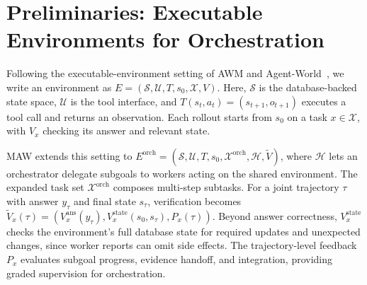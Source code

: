 \section{Preliminaries: Executable Environments for Orchestration}
\label{sec:preliminary}

Following the executable-environment setting of AWM and Agent-World~\citep{wang2026agentworldmodelinfinity,dong2026agentworld}, we write an environment as $E=(\mathcal S,\mathcal U,T,s_0,\mathcal X,V)$. Here, $\mathcal S$ is the database-backed state space, $\mathcal U$ is the tool interface, and $T(s_t,a_t)=(s_{t+1},o_{t+1})$ executes a tool call and returns an observation. Each rollout starts from $s_0$ on a task $x\in\mathcal X$, with $V_x$ checking its answer and relevant state.

MAW extends this setting to $E^{\mathrm{orch}}=(\mathcal S,\mathcal U,T,s_0,\mathcal X^{\mathrm{orch}},\mathcal H,\widetilde V)$, where $\mathcal H$ lets an orchestrator delegate subgoals to workers acting on the shared environment. The expanded task set $\mathcal X^{\mathrm{orch}}$ composes multi-step subtasks. For a joint trajectory $\tau$ with answer $y_\tau$ and final state $s_\tau$, verification becomes $\widetilde V_x(\tau)=(V_x^{\mathrm{ans}}(y_\tau),V_x^{\mathrm{state}}(s_0,s_\tau),P_x(\tau))$. Beyond answer correctness, $V_x^{\mathrm{state}}$ checks the environment's full database state for required updates and unexpected changes, since worker reports can omit side effects. The trajectory-level feedback $P_x$ evaluates subgoal progress, evidence handoff, and integration, providing graded supervision for orchestration.

